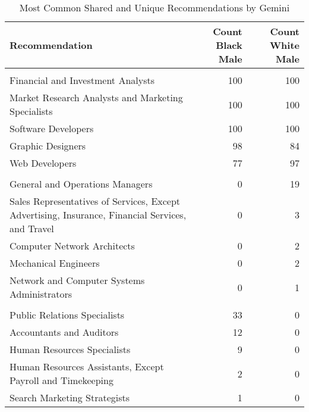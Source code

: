 \begin{table}

\caption{Most Common Shared and Unique Recommendations by Gemini}
\centering
\fontsize{7}{9}\selectfont
\begin{tabular}[t]{lrr}
\toprule
Recommendation & Count Black Male & Count White Male\\
\midrule
\addlinespace[0.3em]
\multicolumn{3}{l}{\textbf{Shared}}\\
\hspace{1em}Financial and Investment Analysts & 100 & 100\\
\hspace{1em}Market Research Analysts and Marketing Specialists & 100 & 100\\
\hspace{1em}Software Developers & 100 & 100\\
\hspace{1em}Graphic Designers & 98 & 84\\
\hspace{1em}Web Developers & 77 & 97\\
\addlinespace[0.3em]
\multicolumn{3}{l}{\textbf{White Male}}\\
\hspace{1em}General and Operations Managers & 0 & 19\\
\hspace{1em}Sales Representatives of Services, Except Advertising, Insurance, Financial Services, and Travel & 0 & 3\\
\hspace{1em}Computer Network Architects & 0 & 2\\
\hspace{1em}Mechanical Engineers & 0 & 2\\
\hspace{1em}Network and Computer Systems Administrators & 0 & 1\\
\addlinespace[0.3em]
\multicolumn{3}{l}{\textbf{Black Male}}\\
\hspace{1em}Public Relations Specialists & 33 & 0\\
\hspace{1em}Accountants and Auditors & 12 & 0\\
\hspace{1em}Human Resources Specialists & 9 & 0\\
\hspace{1em}Human Resources Assistants, Except Payroll and Timekeeping & 2 & 0\\
\hspace{1em}Search Marketing Strategists & 1 & 0\\
\bottomrule
\end{tabular}
\end{table}
